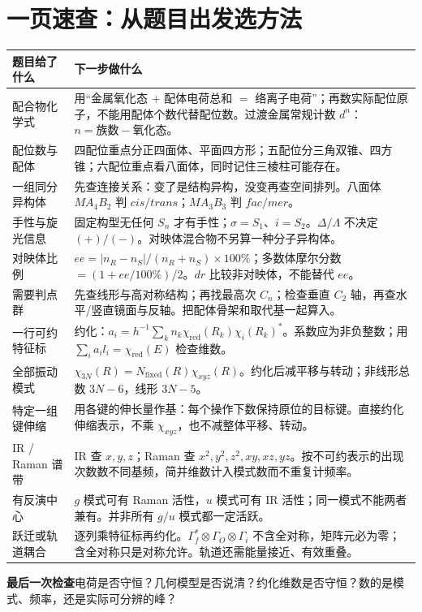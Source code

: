 \clearpage
\section{一页速查：从题目出发选方法}
\normalsize
\noindent
\begin{tabularx}{\linewidth}{@{}p{30mm} X@{}}
\toprule
题目给了什么 & 下一步做什么 \\
\midrule
配合物化学式 & 用“金属氧化态 $+$ 配体电荷总和 $=$ 络离子电荷”；再数实际配位原子，不能用配体个数代替配位数。过渡金属常规计数 $d^n$：$n=\text{族数}-\text{氧化态}$。\\
配位数与配体 & 四配位重点分正四面体、平面四方形；五配位分三角双锥、四方锥；六配位重点看八面体，同时记住三棱柱可能存在。\\
一组同分异构体 & 先查连接关系：变了是结构异构，没变再查空间排列。八面体 $MA_4B_2$ 判 $cis/trans$；$MA_3B_3$ 判 $fac/mer$。\\
手性与旋光信息 & 固定构型无任何 $S_n$ 才有手性；$\sigma=S_1$、$i=S_2$。$\Delta/\Lambda$ 不决定 $(+)/(−)$。对映体混合物不另算一种分子异构体。\\
对映体比例 & $ee=|n_R-n_S|/(n_R+n_S)\times100\%$；多数体摩尔分数 $=(1+ee/100\%)/2$。$dr$ 比较非对映体，不能替代 $ee$。\\
需要判点群 & 先查线形与高对称结构；再找最高次 $C_n$；检查垂直 $C_2$ 轴，再查水平/竖直镜面与反轴。把配体骨架和取代基一起算入。\\
一行可约特征标 & 约化：$a_i=h^{-1}\sum_k n_k\chi_{\mathrm{red}}(R_k)\chi_i(R_k)^*$。系数应为非负整数；用 $\sum_i a_il_i=\chi_{\mathrm{red}}(E)$ 检查维数。\\
全部振动模式 & $\chi_{3N}(R)=N_{\mathrm{fixed}}(R)\chi_{xyz}(R)$。约化后减平移与转动；非线形总数 $3N-6$，线形 $3N-5$。\\
特定一组键伸缩 & 用各键的伸长量作基：每个操作下数保持原位的目标键。直接约化伸缩表示，不乘 $\chi_{xyz}$，也不减整体平移、转动。\\
IR / Raman 谱带 & IR 查 $x,y,z$；Raman 查 $x^2,y^2,z^2,xy,xz,yz$。按不可约表示的出现次数数不同基频，简并维数计入模式数而不重复计频率。\\
有反演中心 & $g$ 模式可有 Raman 活性，$u$ 模式可有 IR 活性；同一模式不能两者兼有。并非所有 $g/u$ 模式都一定活跃。\\
跃迁或轨道耦合 & 逐列乘特征标再约化。$\Gamma_f^*\otimes\Gamma_O\otimes\Gamma_i$ 不含全对称，矩阵元必为零；含全对称只是对称允许。轨道还需能量接近、有效重叠。\\
\bottomrule
\end{tabularx}
\par\vspace{0.8em}
\noindent\textcolor{Muted}{\textbf{最后一次检查}\quad 电荷是否守恒？几何模型是否说清？约化维数是否守恒？数的是模式、频率，还是实际可分辨的峰？}
\normalsize
